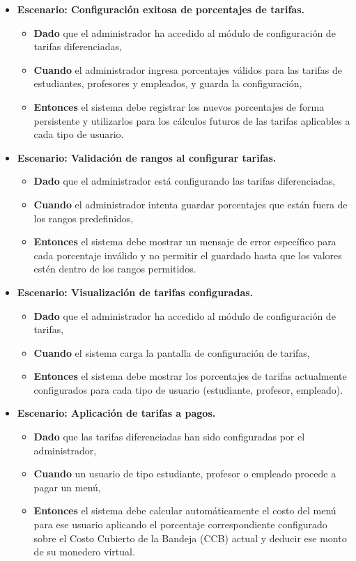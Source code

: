 \documentclass[12pt]{article}
\begin{document}
\begin{itemize}
	\item \textbf{Escenario: Configuración exitosa de porcentajes de tarifas.}
	\begin{itemize}
		\item \textbf{Dado} que el administrador ha accedido al módulo de configuración de tarifas diferenciadas,
		\item \textbf{Cuando} el administrador ingresa porcentajes válidos para las tarifas de estudiantes, profesores y empleados, y guarda la configuración,
		\item \textbf{Entonces} el sistema debe registrar los nuevos porcentajes de forma persistente y utilizarlos para los cálculos futuros de las tarifas aplicables a cada tipo de usuario.
	\end{itemize}

	\item \textbf{Escenario: Validación de rangos al configurar tarifas.}
	\begin{itemize}
		\item \textbf{Dado} que el administrador está configurando las tarifas diferenciadas,
		\item \textbf{Cuando} el administrador intenta guardar porcentajes que están fuera de los rangos predefinidos,
		\item \textbf{Entonces} el sistema debe mostrar un mensaje de error específico para cada porcentaje inválido y no permitir el guardado hasta que los valores estén dentro de los rangos permitidos.
	\end{itemize}

	\item \textbf{Escenario: Visualización de tarifas configuradas.}
	\begin{itemize}
		\item \textbf{Dado} que el administrador ha accedido al módulo de configuración de tarifas,
		\item \textbf{Cuando} el sistema carga la pantalla de configuración de tarifas,
		\item \textbf{Entonces} el sistema debe mostrar los porcentajes de tarifas actualmente configurados para cada tipo de usuario (estudiante, profesor, empleado).
	\end{itemize}

	\item \textbf{Escenario: Aplicación de tarifas a pagos.}
	\begin{itemize}
		\item \textbf{Dado} que las tarifas diferenciadas han sido configuradas por el administrador,
		\item \textbf{Cuando} un usuario de tipo estudiante, profesor o empleado procede a pagar un menú,
		\item \textbf{Entonces} el sistema debe calcular automáticamente el costo del menú para ese usuario aplicando el porcentaje correspondiente configurado sobre el Costo Cubierto de la Bandeja (CCB) actual y deducir ese monto de su monedero virtual.
	\end{itemize}
\end{itemize}
\end{document}
